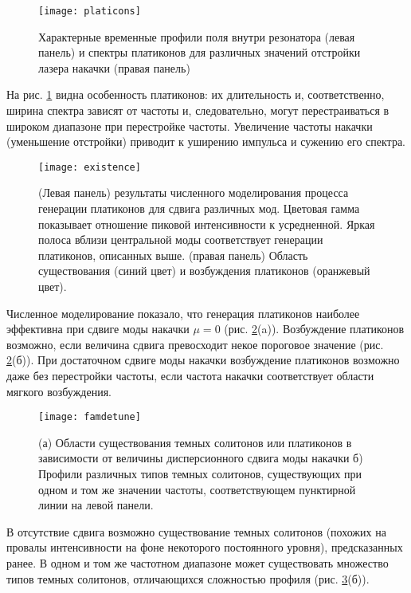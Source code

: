 \begin{figure}
  \centering
  \texttt{[image: platicons]}
  \caption{Характерные временные профили поля внутри резонатора (левая панель) и спектры платиконов для различных значений отстройки лазера накачки (правая панель)} \label{platicons}
\end{figure}


На рис. \ref{platicons} видна особенность платиконов: их длительность и, соответственно, ширина спектра зависят от частоты и, следовательно, могут перестраиваться в широком диапазоне при перестройке частоты. Увеличение частоты накачки (уменьшение отстройки) приводит к уширению импульса и сужению его спектра.

\begin{figure}
  \centering
  \texttt{[image: existence]}
  \caption{(Левая панель) результаты численного моделирования процесса генерации платиконов для сдвига различных мод. Цветовая гамма показывает отношение пиковой интенсивности к усредненной. Яркая полоса вблизи центральной моды соответствует генерации платиконов, описанных выше. (правая панель) Область существования (синий цвет) и возбуждения платиконов (оранжевый цвет).} \label{platicons_existence}
\end{figure}

Численное моделирование показало, что генерация платиконов наиболее эффективна при сдвиге моды накачки $\mu=0$ (рис. \ref{platicons_existence}(a)). Возбуждение платиконов возможно, если величина сдвига превосходит некое пороговое значение (рис. \ref{platicons_existence}(б)). При достаточном сдвиге моды накачки возбуждение платиконов возможно даже без перестройки частоты, если частота накачки соответствует области мягкого возбуждения.

\begin{figure}
  \centering
  \texttt{[image: famdetune]}
  \caption{(а) Области существования темных солитонов или платиконов в зависимости от величины дисперсионного сдвига моды накачки б) Профили различных типов темных солитонов, существующих при одном и том же значении частоты, соответствующем пунктирной линии на левой панели.} \label{platicons_famdetune}
\end{figure}

В отсутствие сдвига возможно существование темных солитонов (похожих на провалы интенсивности на фоне некоторого постоянного уровня), предсказанных ранее. В одном и том же частотном диапазоне может существовать множество типов темных солитонов, отличающихся сложностью профиля (рис. \ref{platicons_famdetune}(б)).

